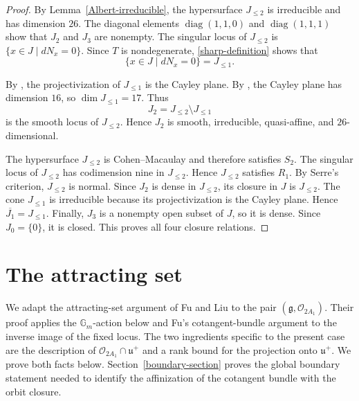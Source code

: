 \documentclass[12pt]{article}
\theoremstyle{definition}
\begin{document}
\begin{proof}
By Lemma~\ref{Albert-irreducible}, the hypersurface \(J_{\leq2}\) is
irreducible and has dimension \(26\). The diagonal elements
\(\operatorname{diag}(1,1,0)\) and \(\operatorname{diag}(1,1,1)\) show
that \(J_2\) and \(J_3\) are nonempty. The singular locus of
\(J_{\leq2}\) is \(\{x\in J\mid dN_x=0\}\). Since \(T\) is nondegenerate,
\eqref{sharp-definition} shows that
\[
    \{x\in J\mid dN_x=0\}=J_{\leq1}.
\]

By \cite[Sections~3.5 and~4.1]{LM}, the projectivization of
\(J_{\leq1}\) is the Cayley plane. By \cite[Proposition~2.1]{LM}, the
Cayley plane has dimension \(16\), so \(\dim J_{\leq1}=17\). Thus
\[
    J_2=J_{\leq2}\setminus J_{\leq1}
\]
is the smooth locus of \(J_{\leq2}\). Hence \(J_2\) is smooth, irreducible,
quasi-affine, and \(26\)-dimensional.

The hypersurface \(J_{\leq2}\) is Cohen--Macaulay and therefore
satisfies \(S_2\). The singular locus of \(J_{\leq2}\) has codimension
nine in \(J_{\leq2}\). Hence \(J_{\leq2}\) satisfies \(R_1\). By Serre's
criterion, \(J_{\leq2}\) is normal. Since \(J_2\) is dense in
\(J_{\leq2}\), its closure in \(J\) is \(J_{\leq2}\). The cone
\(J_{\leq1}\) is irreducible because its projectivization is the Cayley
plane. Hence \(\overline{J_1}=J_{\leq1}\). Finally, \(J_3\) is a nonempty
open subset of \(J\), so it is dense. Since \(J_0=\{0\}\), it is closed.
This proves all four closure relations.
\end{proof}

\section{The attracting set}

We adapt the attracting-set argument of Fu and Liu
\cite[Section~4.2, Lemma~4.1, and Proof of Theorem~4.2]{FuLiu} to the
pair \((\mathfrak g,\mathcal O_{2A_1})\). Their proof applies the \(\mathbb G_m\)-action
below and Fu's cotangent-bundle argument
\cite[Proof of Lemma~3.7]{FuSymplectic} to the inverse image of the fixed
locus. The two ingredients specific to the present case are the
description of \(\mathcal O_{2A_1}\cap\mathfrak u^+\) and a rank bound for the
projection onto \(\mathfrak u^+\). We prove both facts below.
Section~\ref{boundary-section} proves the global boundary
statement needed to identify the affinization of the cotangent bundle
with the orbit closure.
\end{document}
